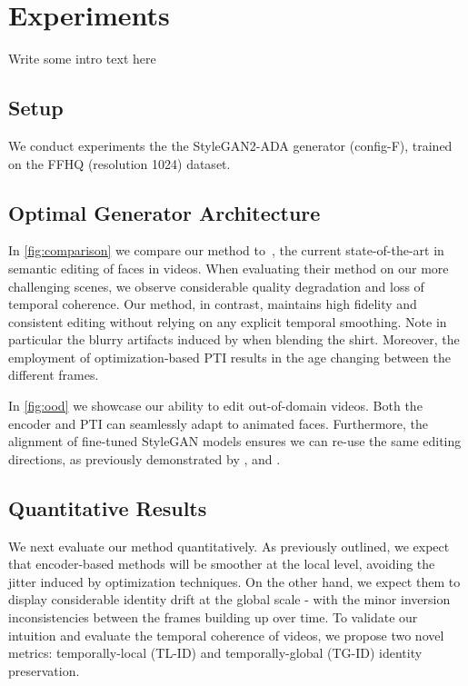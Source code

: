 \section{Experiments}
Write some intro text here
\subsection{Setup}
We conduct experiments the the StyleGAN2-ADA \cite{karras2020training} generator (config-F), trained on the FFHQ \cite{karras2019style} (resolution 1024) dataset.


\subsection{Optimal Generator Architecture}




In \cref{fig:comparison} we compare our method to~\cite{yao2021latent}, the current state-of-the-art in semantic editing of faces in videos. 
When evaluating their method on our more challenging scenes, we observe considerable quality degradation and loss of temporal coherence. Our method, in contrast, maintains high fidelity and consistent editing without relying on any explicit temporal smoothing.
Note in particular the blurry artifacts induced by \cite{yao2021latent} when blending the shirt. Moreover, the employment of optimization-based PTI results in the age changing between the different frames.



In \cref{fig:ood} we showcase our ability to edit out-of-domain videos. Both the encoder and PTI can seamlessly adapt to animated faces. Furthermore, the alignment of fine-tuned StyleGAN models ensures we can re-use the same editing directions, as previously demonstrated by \cite{gal2021stylegannada}, \cite{alaluf2021hyperstyle} and \cite{zhu2021mind}.


\subsection{Quantitative Results}
\label{sec:quantitative}

We next evaluate our method quantitatively. As previously outlined, we expect that encoder-based methods will be smoother at the local level, avoiding the jitter induced by optimization techniques. On the other hand, we expect them to display considerable identity drift at the global scale - with the minor inversion inconsistencies between the frames building up over time. To validate our intuition and evaluate the temporal coherence of videos, we propose two novel metrics: temporally-local (TL-ID) and temporally-global (TG-ID) identity preservation. 



